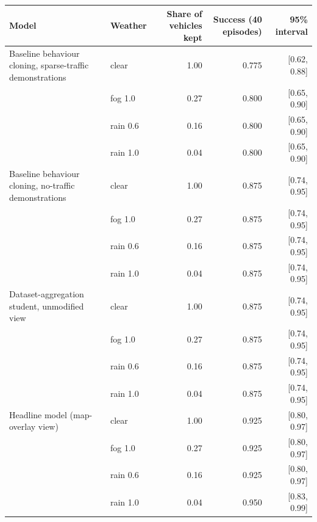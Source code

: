 \begin{tabular}{@{}llrrr@{}}\toprule
Model & Weather & Share of vehicles kept & Success (40 episodes) & 95\% interval\\\midrule
Baseline behaviour cloning, sparse-traffic demonstrations & clear & 1.00 & 0.775 & [0.62, 0.88]\\
 & fog 1.0 & 0.27 & 0.800 & [0.65, 0.90]\\
 & rain 0.6 & 0.16 & 0.800 & [0.65, 0.90]\\
 & rain 1.0 & 0.04 & 0.800 & [0.65, 0.90]\\
Baseline behaviour cloning, no-traffic demonstrations & clear & 1.00 & 0.875 & [0.74, 0.95]\\
 & fog 1.0 & 0.27 & 0.875 & [0.74, 0.95]\\
 & rain 0.6 & 0.16 & 0.875 & [0.74, 0.95]\\
 & rain 1.0 & 0.04 & 0.875 & [0.74, 0.95]\\
Dataset-aggregation student, unmodified view & clear & 1.00 & 0.875 & [0.74, 0.95]\\
 & fog 1.0 & 0.27 & 0.875 & [0.74, 0.95]\\
 & rain 0.6 & 0.16 & 0.875 & [0.74, 0.95]\\
 & rain 1.0 & 0.04 & 0.875 & [0.74, 0.95]\\
Headline model (map-overlay view) & clear & 1.00 & 0.925 & [0.80, 0.97]\\
 & fog 1.0 & 0.27 & 0.925 & [0.80, 0.97]\\
 & rain 0.6 & 0.16 & 0.925 & [0.80, 0.97]\\
 & rain 1.0 & 0.04 & 0.950 & [0.83, 0.99]\\
\bottomrule\end{tabular}
